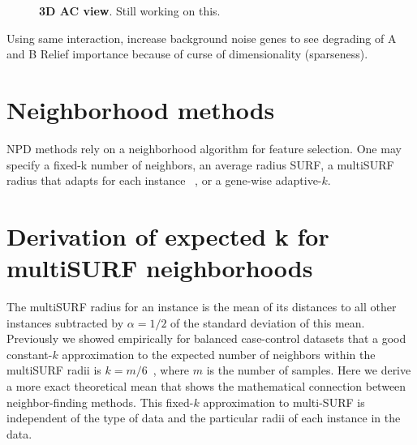 \documentclass[10pt,letterpaper]{article}\usepackage[]{graphicx}\usepackage[]{color}
\begin{document}
\begin{figure}[ht!]
\begin{minipage}[c]{0.4\textheight}
\centering
\end{minipage} \hspace{-0.4cm}
\begin{minipage}[c]{0.5\textwidth}
\centering
\caption{{\bf 3D AC view}. Still working on this. }\label{fig:3d_d}
\end{minipage}
\end{figure}  
Using same interaction, increase background noise genes to see degrading of A and B Relief importance because of curse of dimensionality (sparseness). 

\section{Neighborhood methods}
NPD methods rely on a neighborhood algorithm for feature selection. One may specify a fixed-k number of neighbors, an average radius SURF, a multiSURF radius that adapts for each instance ~\cite{urbanowicz17}, or a gene-wise adaptive-$k$. 

\section{Derivation of expected k for multiSURF neighborhoods}
The multiSURF radius for an instance is the mean of its distances to all other instances subtracted by $\alpha=1/2$ of the standard deviation of this mean. Previously we showed empirically for balanced case-control datasets that a good constant-$k$ approximation to the expected number of neighbors within the multiSURF radii is $k=m/6$~\cite{stir}, where $m$ is the number of samples. Here we derive a more exact theoretical mean that shows the mathematical connection between neighbor-finding methods. This fixed-$k$ approximation to multi-SURF is independent of the type of data and the particular radii of each instance in the data.
%
\end{document}
